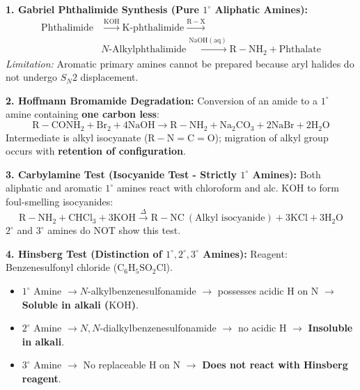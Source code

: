 \documentclass[10pt,twoside,openright]{book}
\begin{document}
\begin{formulabox}
\textbf{1. Gabriel Phthalimide Synthesis (Pure $1^\circ$ Aliphatic Amines):}
\begin{align*}
  \text{Phthalimide} &\xrightarrow{\mathrm{KOH}} \text{K-phthalimide} \xrightarrow{\mathrm{R-X}} \\
  &N\text{-Alkylphthalimide} \xrightarrow{\mathrm{NaOH (aq)}} \mathrm{R-NH_2} + \text{Phthalate}
\end{align*}
\textit{Limitation:} Aromatic primary amines cannot be prepared because aryl halides do not undergo $S_N2$ displacement.

\textbf{2. Hoffmann Bromamide Degradation:}
Conversion of an amide to a $1^\circ$ amine containing \textbf{one carbon less}:
\begin{equation}
  \mathrm{R-CONH_2} + \mathrm{Br_2} + 4\mathrm{NaOH} \longrightarrow \mathrm{R-NH_2} + \mathrm{Na_2CO_3} + 2\mathrm{NaBr} + 2\mathrm{H_2O}
\end{equation}
Intermediate is alkyl isocyanate ($\mathrm{R-N=C=O}$); migration of alkyl group occurs with \textbf{retention of configuration}.

\textbf{3. Carbylamine Test (Isocyanide Test - Strictly $1^\circ$ Amines):}
Both aliphatic and aromatic $1^\circ$ amines react with chloroform and alc. $\mathrm{KOH}$ to form foul-smelling isocyanides:
\begin{equation}
  \mathrm{R-NH_2} + \mathrm{CHCl_3} + 3\mathrm{KOH} \xrightarrow{\Delta} \mathrm{R-NC} \ (\text{Alkyl isocyanide}) + 3\mathrm{KCl} + 3\mathrm{H_2O}
\end{equation}
$2^\circ$ and $3^\circ$ amines do NOT show this test.

\textbf{4. Hinsberg Test (Distinction of $1^\circ, 2^\circ, 3^\circ$ Amines):}
Reagent: Benzenesulfonyl chloride ($\mathrm{C_6H_5SO_2Cl}$).
\begin{itemize}
  \item $1^\circ$ Amine $\to N$-alkylbenzenesulfonamide $\to$ possesses acidic H on N $\to$ \textbf{Soluble in alkali ($\mathrm{KOH}$)}.
  \item $2^\circ$ Amine $\to N,N$-dialkylbenzenesulfonamide $\to$ no acidic H $\to$ \textbf{Insoluble in alkali}.
  \item $3^\circ$ Amine $\to$ No replaceable H on N $\to$ \textbf{Does not react with Hinsberg reagent}.
\end{itemize}
\end{formulabox}
\end{document}
